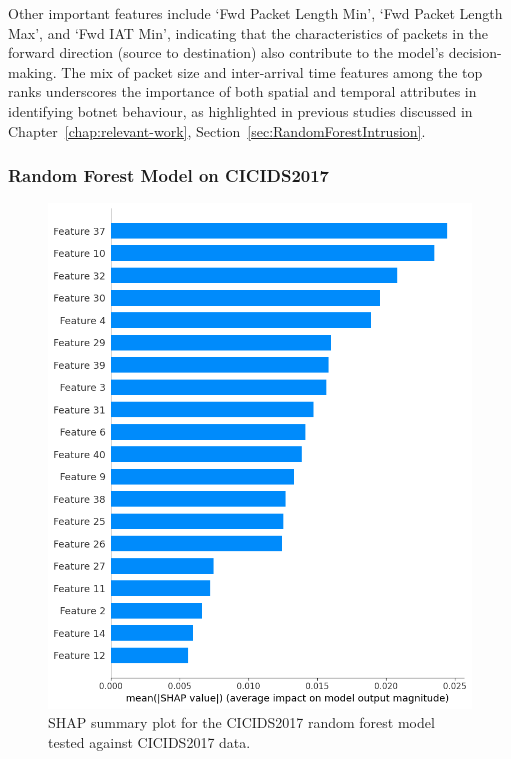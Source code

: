 Other important features include `Fwd Packet Length Min', `Fwd Packet Length Max', and `Fwd IAT Min', indicating that the characteristics of packets in the forward direction (source to destination) also contribute to the model's decision-making. The mix of packet size and inter-arrival time features among the top ranks underscores the importance of both spatial and temporal attributes in identifying botnet behaviour, as highlighted in previous studies discussed in Chapter~\ref{chap:relevant-work}, Section~\ref{sec:RandomForestIntrusion}.

\subsubsection{Random Forest Model on CICIDS2017}\label{subsec:rf-cicids2017}

\begin{figure}[H]
\centering
\includegraphics[width=\textwidth]{img/SHAP_RFCICIDS2017_CICIDS2017.png}
\caption{SHAP summary plot for the CICIDS2017 random forest model tested against CICIDS2017 data.}\label{fig:shap_rfc_cicids2017_cicids2017}
\end{figure}

